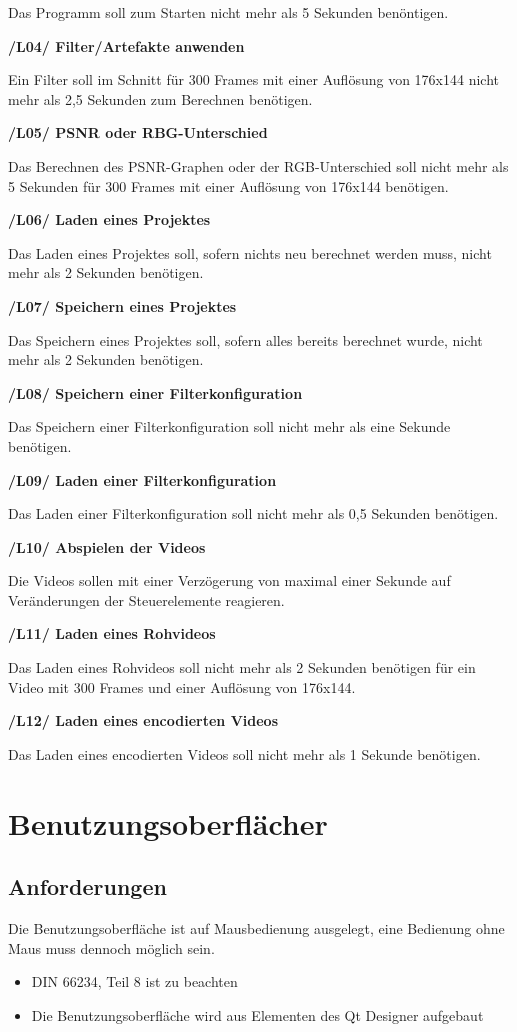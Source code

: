 \documentclass[parskip=full]{scrartcl}
\begin{document}
Das Programm soll zum Starten nicht mehr als 5 Sekunden benöntigen.

\textbf{/L04/ Filter/Artefakte anwenden}

Ein Filter soll im Schnitt für 300 Frames mit einer Auflösung von 176x144 nicht mehr als 2,5 Sekunden zum Berechnen benötigen.

\textbf{/L05/ PSNR oder RBG-Unterschied}

Das Berechnen des PSNR-Graphen oder der RGB-Unterschied soll nicht mehr als 5 Sekunden für 300 Frames mit einer Auflösung von 176x144 benötigen.

\textbf{/L06/ Laden eines Projektes}

Das Laden eines Projektes soll, sofern nichts neu berechnet werden muss, nicht mehr als 2 Sekunden benötigen.

\textbf{/L07/ Speichern eines Projektes}

Das Speichern eines Projektes soll, sofern alles bereits berechnet wurde, nicht mehr als 2 Sekunden benötigen.

\textbf{/L08/ Speichern einer Filterkonfiguration}

Das Speichern einer Filterkonfiguration soll nicht mehr als eine Sekunde benötigen.

\textbf{/L09/ Laden einer Filterkonfiguration}

Das Laden einer Filterkonfiguration soll nicht mehr als 0,5 Sekunden benötigen.

\newpage
\textbf{/L10/ Abspielen der Videos}

Die Videos sollen mit einer Verzögerung von maximal einer Sekunde auf Veränderungen der Steuerelemente reagieren.

\textbf{/L11/ Laden eines Rohvideos}

Das Laden eines Rohvideos soll nicht mehr als 2 Sekunden benötigen für ein Video mit 300 Frames und einer Auflösung von 176x144.

\textbf{/L12/ Laden eines encodierten Videos}

Das Laden eines encodierten Videos soll nicht mehr als 1 Sekunde benötigen.
\newpage
\section{Benutzungsoberflächer}
\subsection{Anforderungen}
Die Benutzungsoberfläche ist auf Mausbedienung ausgelegt, eine Bedienung ohne Maus muss dennoch möglich sein.
\begin{itemize}
\item DIN 66234, Teil 8 ist zu beachten
\item Die Benutzungsoberfläche wird aus Elementen des Qt Designer aufgebaut
\end{itemize}
\end{document}
